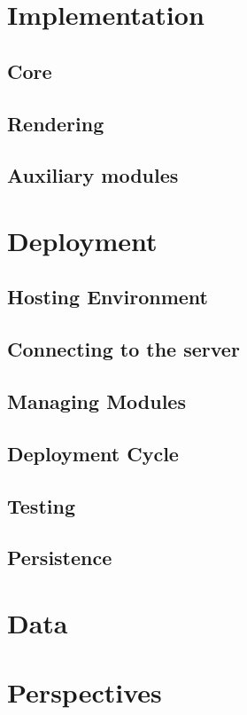 \documentclass[a4paper]{tufte-book}
\begin{document}

\section{Implementation}
\subsection{Core}
\subsection{Rendering}
\subsection{Auxiliary modules}


\section{Deployment}
\subsection{Hosting Environment}
\subsection{Connecting to the server}
\subsection{Managing Modules}
\subsection{Deployment Cycle}
\subsection{Testing}
\subsection{Persistence}


\section{Data}


\section{Perspectives}
\end{document}
